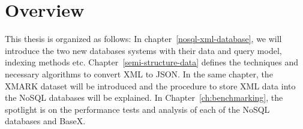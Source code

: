		
	\section{Overview }
		This thesis is organized as follows: In chapter~\ref{nosql-xml-database}, we will introduce the two new databases systems with their data and query model, indexing methods etc. Chapter~\ref{semi-structure-data} defines the techniques and necessary algorithms to convert XML to JSON. In the same chapter, the XMARK dataset will be introduced and the procedure to store XML data into the NoSQL databases will be explained. In Chapter~\ref{ch:benchmarking}, the spotlight is on the performance tests and analysis of each of the NoSQL databases and BaseX.